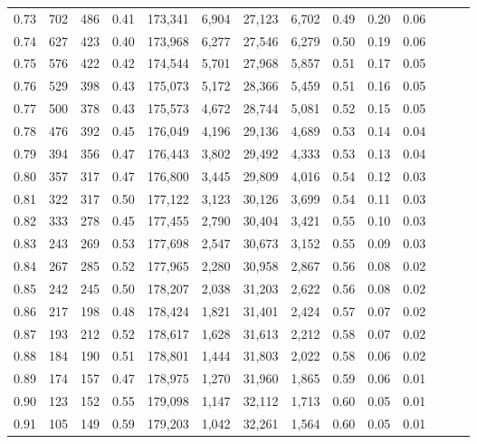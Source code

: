 \begin{tabular}{rrrrrrrrrrrrrr}
0.73 &    702 &  486 &  0.41 &  173,341 &    6,904 &  27,123 &   6,702 &  0.49 &  0.20 &      0.06 \\
0.74 &    627 &  423 &  0.40 &  173,968 &    6,277 &  27,546 &   6,279 &  0.50 &  0.19 &      0.06 \\
0.75 &    576 &  422 &  0.42 &  174,544 &    5,701 &  27,968 &   5,857 &  0.51 &  0.17 &      0.05 \\
0.76 &    529 &  398 &  0.43 &  175,073 &    5,172 &  28,366 &   5,459 &  0.51 &  0.16 &      0.05 \\
0.77 &    500 &  378 &  0.43 &  175,573 &    4,672 &  28,744 &   5,081 &  0.52 &  0.15 &      0.05 \\
0.78 &    476 &  392 &  0.45 &  176,049 &    4,196 &  29,136 &   4,689 &  0.53 &  0.14 &      0.04 \\
0.79 &    394 &  356 &  0.47 &  176,443 &    3,802 &  29,492 &   4,333 &  0.53 &  0.13 &      0.04 \\
0.80 &    357 &  317 &  0.47 &  176,800 &    3,445 &  29,809 &   4,016 &  0.54 &  0.12 &      0.03 \\
0.81 &    322 &  317 &  0.50 &  177,122 &    3,123 &  30,126 &   3,699 &  0.54 &  0.11 &      0.03 \\
0.82 &    333 &  278 &  0.45 &  177,455 &    2,790 &  30,404 &   3,421 &  0.55 &  0.10 &      0.03 \\
0.83 &    243 &  269 &  0.53 &  177,698 &    2,547 &  30,673 &   3,152 &  0.55 &  0.09 &      0.03 \\
0.84 &    267 &  285 &  0.52 &  177,965 &    2,280 &  30,958 &   2,867 &  0.56 &  0.08 &      0.02 \\
0.85 &    242 &  245 &  0.50 &  178,207 &    2,038 &  31,203 &   2,622 &  0.56 &  0.08 &      0.02 \\
0.86 &    217 &  198 &  0.48 &  178,424 &    1,821 &  31,401 &   2,424 &  0.57 &  0.07 &      0.02 \\
0.87 &    193 &  212 &  0.52 &  178,617 &    1,628 &  31,613 &   2,212 &  0.58 &  0.07 &      0.02 \\
0.88 &    184 &  190 &  0.51 &  178,801 &    1,444 &  31,803 &   2,022 &  0.58 &  0.06 &      0.02 \\
0.89 &    174 &  157 &  0.47 &  178,975 &    1,270 &  31,960 &   1,865 &  0.59 &  0.06 &      0.01 \\
0.90 &    123 &  152 &  0.55 &  179,098 &    1,147 &  32,112 &   1,713 &  0.60 &  0.05 &      0.01 \\
0.91 &    105 &  149 &  0.59 &  179,203 &    1,042 &  32,261 &   1,564 &  0.60 &  0.05 &      0.01 \\

\end{tabular}
